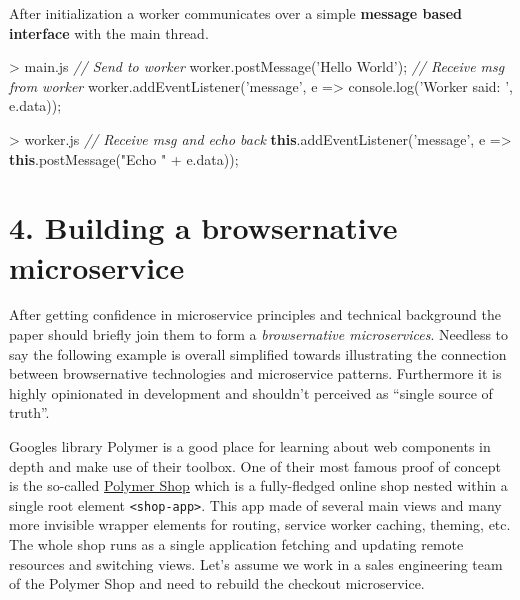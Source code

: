 \documentclass[]{article}
\newenvironment{Shaded}{}{}
\newcommand{\KeywordTok}[1]{\textcolor[rgb]{0.00,0.44,0.13}{\textbf{{#1}}}}
\newcommand{\StringTok}[1]{\textcolor[rgb]{0.25,0.44,0.63}{{#1}}}
\newcommand{\CommentTok}[1]{\textcolor[rgb]{0.38,0.63,0.69}{\textit{{#1}}}}
\newcommand{\VariableTok}[1]{\textcolor[rgb]{0.10,0.09,0.49}{{#1}}}
\newcommand{\OperatorTok}[1]{\textcolor[rgb]{0.40,0.40,0.40}{{#1}}}
\newcommand{\AttributeTok}[1]{\textcolor[rgb]{0.49,0.56,0.16}{{#1}}}
\newcommand{\NormalTok}[1]{{#1}}
\begin{document}
After initialization a worker communicates over a simple \textbf{message
based interface} with the main thread.

\begin{Shaded}
\begin{Highlighting}[]
\OperatorTok{>} \VariableTok{main}\NormalTok{.}\AttributeTok{js}
\CommentTok{// Send to worker}
\VariableTok{worker}\NormalTok{.}\AttributeTok{postMessage}\NormalTok{(}\StringTok{'Hello World'}\NormalTok{)}\OperatorTok{;}
\CommentTok{// Receive msg from worker}
\VariableTok{worker}\NormalTok{.}\AttributeTok{addEventListener}\NormalTok{(}\StringTok{'message'}\OperatorTok{,} \NormalTok{e }\OperatorTok{=>}
 \VariableTok{console}\NormalTok{.}\AttributeTok{log}\NormalTok{(}\StringTok{'Worker said: '}\OperatorTok{,} \VariableTok{e}\NormalTok{.}\AttributeTok{data}\NormalTok{))}\OperatorTok{;}
\end{Highlighting}
\end{Shaded}

\begin{Shaded}
\begin{Highlighting}[]
\OperatorTok{>} \VariableTok{worker}\NormalTok{.}\AttributeTok{js}
\CommentTok{// Receive msg and echo back}
\KeywordTok{this}\NormalTok{.}\AttributeTok{addEventListener}\NormalTok{(}\StringTok{'message'}\OperatorTok{,} \NormalTok{e }\OperatorTok{=>}
 \KeywordTok{this}\NormalTok{.}\AttributeTok{postMessage}\NormalTok{(}\StringTok{"Echo "} \OperatorTok{+} \VariableTok{e}\NormalTok{.}\AttributeTok{data}\NormalTok{))}\OperatorTok{;}
\end{Highlighting}
\end{Shaded}

\section{4. Building a browsernative
microservice}\label{building-a-browsernative-microservice}

After getting confidence in microservice principles and technical
background the paper should briefly join them to form a
\emph{browsernative microservices}. Needless to say the following
example is overall simplified towards illustrating the connection
between browsernative technologies and microservice patterns.
Furthermore it is highly opinionated in development and shouldn't
perceived as ``single source of truth''.

Googles library Polymer is a good place for learning about web
components in depth and make use of their toolbox. One of their most
famous proof of concept is the so-called
\href{https://shop.polymer-project.org/}{Polymer Shop} which is a
fully-fledged online shop nested within a single root element
\texttt{\textless{}shop-app\textgreater{}}. This app made of several
main views and many more invisible wrapper elements for routing, service
worker caching, theming, etc. The whole shop runs as a single
application fetching and updating remote resources and switching views.
Let's assume we work in a sales engineering team of the Polymer Shop and
need to rebuild the checkout microservice.
\end{document}

